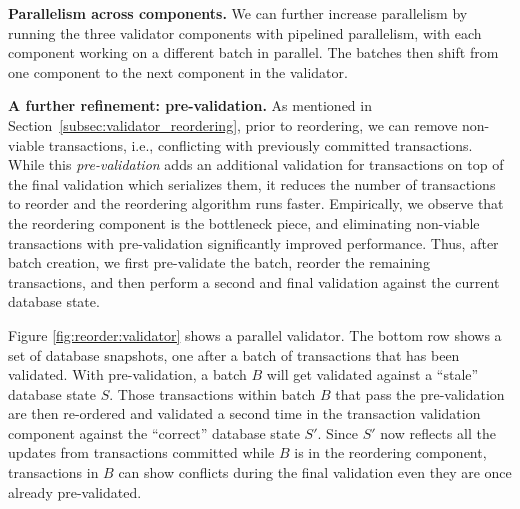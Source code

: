{\bf Parallelism across components.}
We can further increase parallelism by running the three validator components with pipelined parallelism, 
with each component working on a different batch in parallel. The batches then shift from one component to the next component in the validator.

{\bf A further refinement: pre-validation.} As mentioned in Section~\ref{subsec:validator_reordering}, prior to reordering, we can remove non-viable transactions, i.e., conflicting with previously committed transactions. While this \emph{pre-validation} adds an additional validation for transactions on top of the final validation which serializes them, it reduces the number of transactions to reorder and the reordering algorithm runs faster. Empirically, we observe that the reordering component is the bottleneck piece, and eliminating non-viable transactions with pre-validation significantly improved performance. Thus, after batch creation, we first pre-validate the batch, reorder the remaining transactions, and then perform a second and final validation against the current database state.

Figure \ref{fig:reorder:validator} shows a parallel validator. The bottom row shows a set of database snapshots, one after a batch of transactions that has been validated. With pre-validation, a batch $B$ will get validated against a ``stale'' database state $S$. Those transactions within batch $B$ that pass the pre-validation are then re-ordered and validated a second time in the transaction validation component against the ``correct'' database state $S'$. Since $S'$ now reflects all the updates from transactions committed while $B$ is in the reordering component, transactions in $B$ can show conflicts during the final validation even  they are once already pre-validated.



